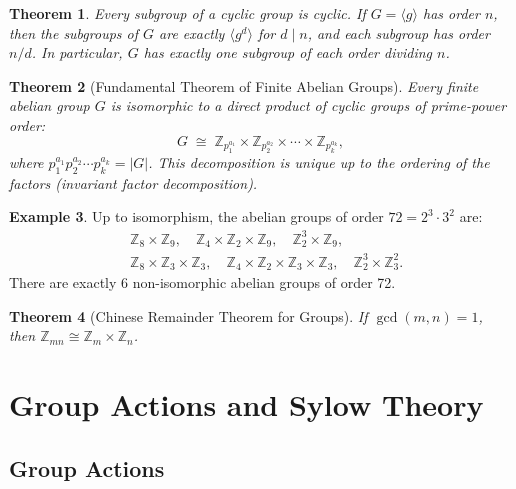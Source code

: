 \documentclass[12pt,a4paper]{amsart}
\newtheorem{theorem}{Theorem}[section]
\theoremstyle{definition}
\newtheorem{example}[theorem]{Example}
\begin{document}
\begin{theorem}
Every subgroup of a cyclic group is cyclic. If $G = \langle g \rangle$ has order $n$,
then the subgroups of $G$ are exactly $\langle g^d \rangle$ for $d \mid n$, and each
subgroup has order $n/d$. In particular, $G$ has exactly one subgroup of each order
dividing $n$.
\end{theorem}

\begin{theorem}[Fundamental Theorem of Finite Abelian Groups]
\label{thm:ftfag}
Every finite abelian group $G$ is isomorphic to a direct product of cyclic groups of
prime-power order:
\[
  G \;\cong\; \mathbb{Z}_{p_1^{a_1}} \times \mathbb{Z}_{p_2^{a_2}} \times \cdots
              \times \mathbb{Z}_{p_k^{a_k}},
\]
where $p_1^{a_1} p_2^{a_2} \cdots p_k^{a_k} = |G|$.
This decomposition is unique up to the ordering of the factors (invariant factor
decomposition).
\end{theorem}

\begin{example}
Up to isomorphism, the abelian groups of order $72 = 2^3 \cdot 3^2$ are:
\begin{align*}
  &\mathbb{Z}_8 \times \mathbb{Z}_9,\quad
   \mathbb{Z}_4 \times \mathbb{Z}_2 \times \mathbb{Z}_9,\quad
   \mathbb{Z}_2^3 \times \mathbb{Z}_9,\\
  &\mathbb{Z}_8 \times \mathbb{Z}_3 \times \mathbb{Z}_3,\quad
   \mathbb{Z}_4 \times \mathbb{Z}_2 \times \mathbb{Z}_3 \times \mathbb{Z}_3,\quad
   \mathbb{Z}_2^3 \times \mathbb{Z}_3^2.
\end{align*}
There are exactly 6 non-isomorphic abelian groups of order 72.
\end{example}

\begin{theorem}[Chinese Remainder Theorem for Groups]
If $\gcd(m,n) = 1$, then $\mathbb{Z}_{mn} \cong \mathbb{Z}_m \times \mathbb{Z}_n$.
\end{theorem}

\section{Group Actions and Sylow Theory}
\label{sec:actions}

\subsection{Group Actions}
\end{document}
